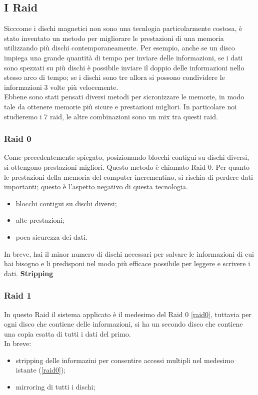 \documentclass{article}
\begin{document}
\subsection{I Raid}

Sicccome i dischi magnetici non sono una tecnlogia particolarmente costosa, è stato inventato un metodo per migliorare le prestazioni di una memoria utilizzando più dischi contemporaneamente. Per esempio, anche se un disco impiega una grande quantità di tempo per inviare delle informazioni, se i dati sono spezzati su più dischi è possibile inviare il doppio delle informazioni nello stesso arco di tempo; se i dischi sono tre allora si possono condividere le informazioni 3 volte più velocemente.\\
Ebbene sono stati pensati diversi metodi per sicronizzare le memorie, in modo tale da ottenere memorie più sicure e prestazioni migliori. In particolare noi studieremo i 7 raid, le altre combinazioni sono un mix tra questi raid.

\setcounter{subsubsection}{-1}
\subsubsection{Raid 0}
\label{raid0}
Come precedentemente spiegato, posizionando blocchi contigui su dischi diversi, si ottengono prestazioni migliori. Questo metodo è chiamato Raid 0. Per quanto le prestazioni della memoria del computer incrementino, si rischia di perdere dati importanti; questo è l'aspetto negativo di questa tecnologia.

\begin{itemize}
	\item blocchi contigui su dischi diversi;

	\item alte prestazioni;

	\item poca sicurezza dei dati.
\end{itemize}

In breve, hai il minor numero di dischi necessari per salvare le informazioni di cui hai bisogno e li predisponi nel modo più efficace possibile per leggere e scrivere i dati. \textbf{Stripping}

\subsubsection{Raid 1}
\label{raid1}
In questo Raid il sistema applicato è il medesimo del Raid 0 \autoref{raid0}, tuttavia per ogni disco che contiene delle informazioni, si ha un secondo disco che contiene una copia esatta di tutti i dati del primo. \\
In breve:
\begin{itemize}
 \item stripping delle informazini per consentire accessi multipli nel medesimo istante (\autoref{raid0});

 \item mirroring di tutti i dischi;
\end{itemize}
\end{document}
